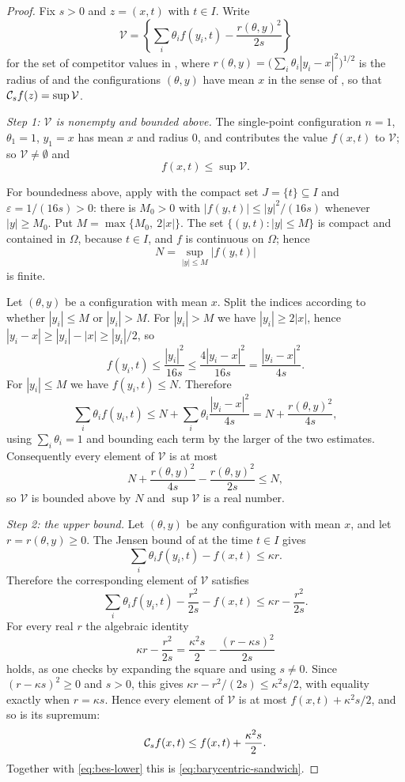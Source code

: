 \begin{proof}
Fix $s>0$ and $z=(x,t)$ with $t\in I$. Write
\[
  \mathcal V=\left\{\sum_i\theta_if(y_i,t)
      -\frac{r(\theta,y)^2}{2s}\right\}
\]
for the set of competitor values in , where
$r(\theta,y)=\bigl(\sum_i\theta_i|y_i-x|^2\bigr)^{1/2}$ is the radius of
 and the configurations $(\theta,y)$ have mean $x$ in the
sense of , so that $\mathcal{C}_sf(z)=\sup\mathcal V$.

\emph{Step 1: $\mathcal V$ is nonempty and bounded above.}
The single-point configuration $n=1$, $\theta_1=1$, $y_1=x$ has mean $x$ and
radius $0$, and contributes the value $f(x,t)$ to $\mathcal V$; so
$\mathcal V\ne\emptyset$ and
\begin{equation}\label{eq:bes-lower}
  f(x,t)\le\sup\mathcal V .
\end{equation}

For boundedness above, apply  with the compact set
$J=\{t\}\subseteq I$ and $\varepsilon=1/(16s)>0$: there is $M_0>0$ with
$|f(y,t)|\le|y|^2/(16s)$ whenever $|y|\ge M_0$. Put
$M=\max\{M_0,\ 2|x|\}$. The set $\{(y,t):|y|\le M\}$ is compact and contained in
$\Omega$, because $t\in I$, and $f$ is continuous on $\Omega$; hence
\[
  N=\sup_{|y|\le M}|f(y,t)|
\]
is finite.

Let $(\theta,y)$ be a configuration with mean $x$. Split the indices according
to whether $|y_i|\le M$ or $|y_i|>M$. For $|y_i|>M$ we have $|y_i|\ge2|x|$,
hence $|y_i-x|\ge|y_i|-|x|\ge|y_i|/2$, so
\[
  f(y_i,t)\le\frac{|y_i|^2}{16s}\le\frac{4|y_i-x|^2}{16s}
     =\frac{|y_i-x|^2}{4s}.
\]
For $|y_i|\le M$ we have $f(y_i,t)\le N$. Therefore
\[
  \sum_i\theta_if(y_i,t)
   \le N+\sum_i\theta_i\frac{|y_i-x|^2}{4s}
   =N+\frac{r(\theta,y)^2}{4s},
\]
using $\sum_i\theta_i=1$ and bounding each term by the larger of the two
estimates. Consequently every element of $\mathcal V$ is at most
\[
  N+\frac{r(\theta,y)^2}{4s}-\frac{r(\theta,y)^2}{2s}\le N,
\]
so $\mathcal V$ is bounded above by $N$ and $\sup\mathcal V$ is a real number.

\emph{Step 2: the upper bound.}
Let $(\theta,y)$ be any configuration with mean $x$, and let
$r=r(\theta,y)\ge0$. The Jensen bound of  at the time
$t\in I$ gives
\[
  \sum_i\theta_if(y_i,t)-f(x,t)\le\kappa r .
\]
Therefore the corresponding element of $\mathcal V$ satisfies
\[
  \sum_i\theta_if(y_i,t)-\frac{r^2}{2s}-f(x,t)
   \le\kappa r-\frac{r^2}{2s}.
\]
For every real $r$ the algebraic identity
\[
  \kappa r-\frac{r^2}{2s}
   =\frac{\kappa^2s}{2}-\frac{(r-\kappa s)^2}{2s}
\]
holds, as one checks by expanding the square and using $s\ne0$. Since
$(r-\kappa s)^2\ge0$ and $s>0$, this gives
$\kappa r-r^2/(2s)\le\kappa^2s/2$, with equality exactly when $r=\kappa s$.
Hence every element of $\mathcal V$ is at most $f(x,t)+\kappa^2s/2$, and so is
its supremum:
\[
  \mathcal{C}_sf(x,t)\le f(x,t)+\frac{\kappa^2s}{2}.
\]
Together with \eqref{eq:bes-lower} this is
\eqref{eq:barycentric-sandwich}.
\end{proof}
